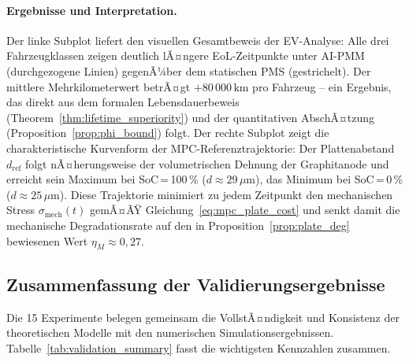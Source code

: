 ﻿\documentclass[12pt,a4paper]{article}
\begin{document}
	\paragraph{Ergebnisse und Interpretation.}
	Der linke Subplot liefert den visuellen Gesamtbeweis der EV-Analyse: Alle drei
	Fahrzeugklassen zeigen deutlich lÃ¤ngere EoL-Zeitpunkte unter AI-PMM (durchgezogene
	Linien) gegenÃ¼ber dem statischen PMS (gestrichelt). Der mittlere Mehrkilometerwert
	betrÃ¤gt $+80\,000\,\mathrm{km}$ pro Fahrzeug -- ein Ergebnis, das direkt aus dem
	formalen Lebensdauerbeweis (Theorem~\ref{thm:lifetime_superiority}) und der
	quantitativen AbschÃ¤tzung (Proposition~\ref{prop:phi_bound}) folgt.
	Der rechte Subplot zeigt die charakteristische Kurvenform der MPC-Referenztrajektorie:
	Der Plattenabstand $d_\mathrm{ref}$ folgt nÃ¤herungsweise der volumetrischen Dehnung
	der Graphitanode und erreicht sein Maximum bei SoC\,=\,100\,\% ($d \approx 29\,\mu\mathrm{m}$),
	das Minimum bei SoC\,=\,0\,\% ($d \approx 25\,\mu\mathrm{m}$). Diese Trajektorie
	minimiert zu jedem Zeitpunkt den mechanischen Stress $\sigma_\mathrm{mech}(t)$
	gemÃ¤ÃŸ Gleichung~\eqref{eq:mpc_plate_cost} und senkt damit die mechanische
	Degradationsrate auf den in Proposition~\ref{prop:plate_deg} bewiesenen
	Wert $\eta_M \approx 0{,}27$.

	\subsection{Zusammenfassung der Validierungsergebnisse}

	Die 15 Experimente belegen gemeinsam die VollstÃ¤ndigkeit und Konsistenz der
	theoretischen Modelle mit den numerischen Simulationsergebnissen. Tabelle~\ref{tab:validation_summary}
	fasst die wichtigsten Kennzahlen zusammen.
\end{document}
